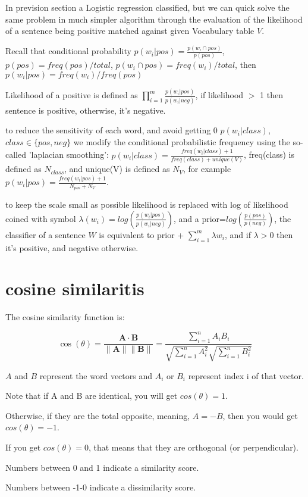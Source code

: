 \documentclass[4apaper,12pt]{book}
\begin{document}
\begin{description}
\item In prevision section a Logistic regression classified, but we can quick solve the same problem in much simpler algorithm through the evaluation of the likelihood of a sentence being positive matched against given Vocabulary table $V$.
\item Recall that conditional probability $p(w_i|pos) = \frac{p(w_i\cap{pos})}{p(pos)}$, $p(pos)=freq(pos)/total$, $p(w_i\cap{pos})=freq(w_i)/total$, then $p(w_i|pos)=freq(w_i)/freq(pos)$
\item Likelihood of a positive is defined as $\prod_{i=1}^{m}{\frac{p(w_i|pos)}{p(w_i|neg)}}$, if likelihood $>$ 1 then sentence is positive, otherwise, it's negative.
\item to reduce the sensitivity of each word, and avoid getting 0 $p(w_i|class)$, $class\in \{pos, neg\}$ we modify the conditional probabilistic frequency using the so-called 'laplacian smoothing': $p(w_i|class)=\frac{freq(w_i|class)+1}{freq(class)+unique(V)}$, freq(class) is defined as $N_{class}$, and unique(V) is defined as $N_V$, for example $p(w_i|pos)=\frac{freq(w_i|pos)+1}{N_{pos}+N_V}$.
\item to keep the scale small as possible likelihood is replaced with log of likelihood coined with symbol $\lambda(w_i)=log(\frac{p(w_i|pos)}{p(w_i|neg)})$, and a prior=$log(\frac{p(pos)}{p(neg)})$, the classifier of a sentence $W$ is equivalent to prior + $\sum_{i=1}^{m}{\lambda{w_i}}$, and if $\lambda>0$ then it's positive, and negative otherwise.
\end{description}
\section {cosine similaritis}
\begin{description}

\item The cosine similarity function is:

\item $$\cos (\theta)=\frac{\mathbf{A} \cdot \mathbf{B}}{\|\mathbf{A}\|\|\mathbf{B}\|}=\frac{\sum_{i=1}^{n} A_{i} B_{i}}{\sqrt{\sum_{i=1}^{n} A_{i}^{2}} \sqrt{\sum_{i=1}^{n} B_{i}^{2}}}$$

\item $A$ and $B$ represent the word vectors and $A_i$ or $B_i$ represent index i of that vector.
\item Note that if A and B are identical, you will get $cos(\theta) = 1$.
\item Otherwise, if they are the total opposite, meaning, $A= -B$, then you would get $cos(\theta) = -1$.
\item If you get $cos(\theta) =0$, that means that they are orthogonal (or perpendicular).
\item Numbers between 0 and 1 indicate a similarity score.
\item Numbers between -1-0 indicate a dissimilarity score.
\end{description}
\end{document}
